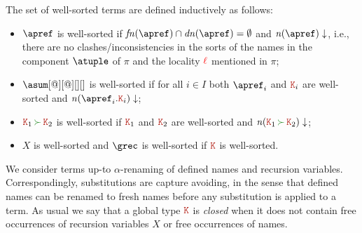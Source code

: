 The set of well-sorted terms are defined inductively as follows:

\begin{itemize}
\item $\apref$ is well-sorted if $\fn\apref\cap\dn\apref = \emptyset$ and  
$\consistent{\names\apref}$, i.e., there are no clashes/inconsistencies in the sorts of 
the names in the component $\atuple$ of $\pi$ and the locality ${\color{red}\ell}$ mentioned in $\pi$;
\item $\asum[@][@][][]$ is well-sorted if for all ${i\in I}$ both
  $\apref_i$ and ${\aK_i}$ are well-sorted and
  $\consistent{\names {\apref_i.\aK_i}}$;
\item $\aK_1 \seqop \aK_2$ is well-sorted if $\aK_1$ and $\aK_2$ are
  well-sorted and $\consistent{\names{\aK_1 \seqop \aK_2}}$;
\item $X$ is well-sorted and $\grec$ is well-sorted if $\aK$ is
  well-sorted.
\end{itemize}


We consider terms up-to $\alpha$-renaming of defined names and
recursion variables.
%
Correspondingly, substitutions are capture avoiding, in the sense that
defined names can be renamed to fresh names before any substitution is
applied to a term.
%
As usual we say that a global type $\aK$ is \emph{closed} when it does
not contain free occurrences of recursion variables $X$ or free
occurrences of names.%


  
